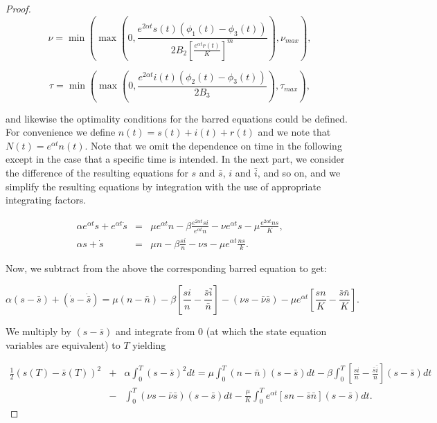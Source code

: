 \begin{proof}
\begin{equation}\label{eq.1.4.33}
\nu=\min\left(\max\left(0,\frac{e^{2\alpha t}s(t)(\phi_1(t)-\phi_3(t))}{2B_2\left[\frac{e^{\alpha t}r(t)}{K}\right]^m}\right),\nu_{max}\right),
\end{equation}

\begin{equation}\label{eq.1.4.34}
\tau=\min\left(\max\left(0,\frac{e^{2\alpha t}i(t)(\phi_2(t)-\phi_3(t))}{2B_3}\right),\tau_{max}\right),
\end{equation}

and likewise the optimality conditions for the barred equations could be defined. For convenience we define $n(t)=s(t)+i(t)+r(t)$ and we note that $N(t)=e^{\alpha t}n(t)$. Note that we omit the dependence on time in the following except in the case that a specific time is intended. In the next part, we consider the difference of the resulting equations for $s$ and $\bar{s}$, $i$ and $\bar{i}$, and so on, and we simplify the resulting equations by integration with the use of appropriate integrating factors.

\begin{eqnarray*}
	\alpha e^{\alpha t}s+ e^{\alpha t}\dot{s}&=&\mu e^{\alpha t}n-\beta \frac{e^{2\alpha t}si}{e^{\alpha t} n}-\nu e^{\alpha t} s-\mu \frac{e^{2\alpha t} ns}{K},\\
	\alpha s+\dot{s}&=&\mu n-\beta \frac{si}{n}-\nu s-\mu e^{\alpha t}\frac{n s}{k}.
\end{eqnarray*}

Now, we subtract from the above the corresponding barred equation to get:

\begin{equation*}
\alpha (s-\bar{s})+(\dot{s}-\dot{\bar{s}})=\mu(n-\bar{n})-\beta\left[\frac{si}{n}-\frac{\bar{s}\bar{i}}{\bar{n}}\right]-(\nu s-\bar{\nu}\bar{s})-\mu e^{\alpha t}\left[\frac{sn}{K}-\frac{\bar{s}\bar{n}}{K}\right]. 
\end{equation*}

We multiply by $(s-\bar{s})$ and integrate from 0 (at which  the state equation variables are equivalent) to $T$ yielding

\begin{eqnarray}
\frac{1}{2}(s(T)-\bar{s}(T))^2&+&\alpha\int_{0}^{T}(s-\bar{s})^2dt=\mu\int_{0}^{T}(n-\bar{n})(s-\bar{s})dt-\beta\int_{0}^{T}\left[\frac{si}{n}-\frac{\bar{s}\bar{i}}{\bar{n}}\right](s-\bar{s})dt\nonumber\\
&-&\int_{0}^{T}(\nu s-\bar{\nu}\bar{s})(s-\bar{s})dt-\frac{\mu}{K}\int_{0}^{T} e^{\alpha t}\left[sn-\bar{s}\bar{n}\right](s-\bar{s})dt. \label{eq.1.4.35}
\end{eqnarray}


\end{proof}
